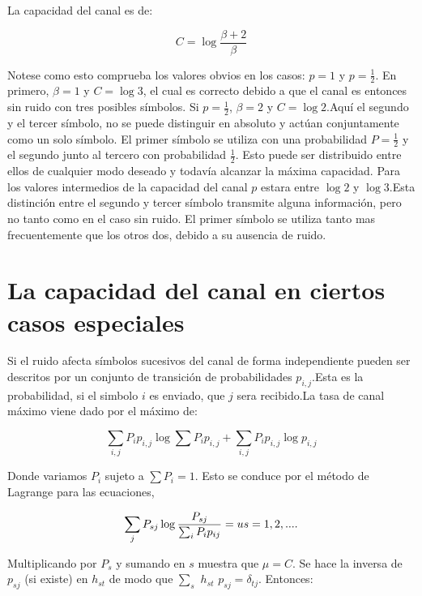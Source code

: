La capacidad del canal es de:

\begin{equation}
  C = \log{\frac{\beta + 2}{\beta}}
\end{equation}

Notese como esto comprueba los valores obvios en los casos: $p = 1$ y $p = \frac{1}{2}$. En primero, $\beta = 1$ y $C = \log{3}$, 
el cual es correcto debido a que el canal es entonces sin ruido con tres posibles s\'imbolos. Si $p = \frac{1}{2}$, $\beta = 2$ y 
$C = \log{2}$.Aqu\'i el segundo y el tercer s\'imbolo, no se puede distinguir en absoluto y act\'uan conjuntamente como un solo 
s\'imbolo. El primer s\'imbolo se utiliza con una probabilidad $P = \frac{1}{2}$  y el segundo junto al tercero con probabilidad $\frac{1}{2}$. Esto puede ser distribuido entre ellos de cualquier modo deseado y todav\'ia alcanzar la m\'axima capacidad.
Para los valores intermedios de la capacidad del canal $p$ estara entre $\log{2}$ y $\log{3}$.Esta distinci\'on 
entre el segundo y tercer s\'imbolo transmite alguna informaci\'on, pero no tanto como en el caso sin ruido.
El primer s\'imbolo se utiliza tanto mas frecuentemente que los otros dos, debido a su ausencia de ruido.

\clearpage

\chapter{La capacidad del canal en ciertos casos especiales}
\label{sec:16}

Si el ruido afecta s\'imbolos sucesivos del canal de forma independiente pueden ser descritos por un conjunto de 
transici\'on de probabilidades $p_{i,j}$.Esta es la probabilidad, si el simbolo $i$ es
enviado, que $j$ sera recibido.La tasa de canal m\'aximo viene dado por el m\'aximo de:

\begin{equation}
  \sum_{i,j}P_i p_{i,j} \log{\sum{P_i p_{i,j}}} + \sum_{i,j}P_i p_{i,j}\log{p_{i,j}}
\end{equation}
 
Donde variamos $P_i$ sujeto a $ \sum P_i = 1$. Esto se conduce por el m\'etodo de Lagrange para las ecuaciones,

\begin{equation}
\sum_{j}P_{sj} \log{\frac{P_{sj}}{\sum_{i} P_i p_{ij} }} = u \\
s = 1,2,....
\end{equation}

Multiplicando por $P_s$ y sumando en $s$ muestra que $\mu = C$. Se hace la inversa de $p_{sj}$ (si existe) en $h_{st}$  de modo que 
$\sum_{s}$ $h_{st}$ $p_{sj} = \delta_{tj}$. Entonces: 

